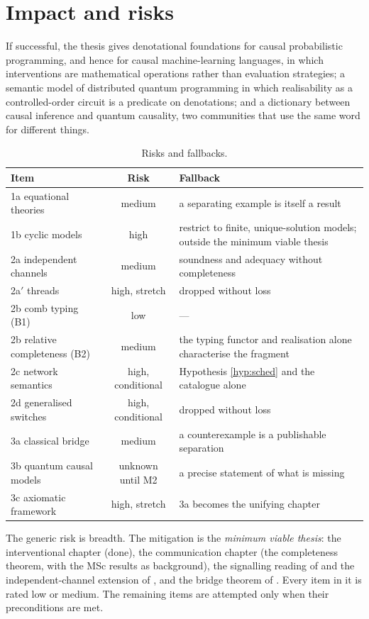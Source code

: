 \section{Impact and risks}

If successful, the thesis gives denotational foundations for causal probabilistic programming, and hence for causal machine-learning languages, in which interventions are mathematical operations rather than evaluation strategies; a semantic model of distributed quantum programming in which realisability as a controlled-order circuit is a predicate on denotations; and a dictionary between causal inference and quantum causality, two communities that use the same word for different things.

\begin{table}[ht]
\centering\small
\begin{tabularx}{\textwidth}{lcX}
\toprule
Item & Risk & Fallback\\
\midrule
1a equational theories & medium & a separating example is itself a result\\
1b cyclic models & high & restrict to finite, unique-solution models; outside the minimum viable thesis\\
2a independent channels & medium & soundness and adequacy without completeness\\
2a$'$ threads & high, stretch & dropped without loss\\
2b comb typing (B1) & low & ---\\
2b relative completeness (B2) & medium & the typing functor and realisation alone characterise the fragment\\
2c network semantics & high, conditional & Hypothesis \ref{hyp:sched} and the catalogue alone\\
2d generalised switches & high, conditional & dropped without loss\\
3a classical bridge & medium & a counterexample is a publishable separation\\
3b quantum causal models & unknown until M2 & a precise statement of what is missing\\
3c axiomatic framework & high, stretch & 3a becomes the unifying chapter\\
\bottomrule
\end{tabularx}
\caption{Risks and fallbacks.}
\end{table}

The generic risk is breadth. The mitigation is the \emph{minimum viable thesis}: the interventional chapter (done), the communication chapter (the completeness theorem, with the MSc results as background), the signalling reading of  and the independent-channel extension of , and the bridge theorem of . Every item in it is rated low or medium. The remaining items are attempted only when their preconditions are met.

